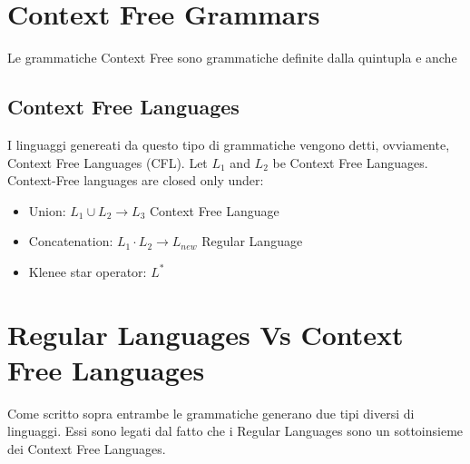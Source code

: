 \section{Context Free Grammars}
Le grammatiche Context Free sono grammatiche definite dalla quintupla \newline e anche

\subsection{Context Free Languages}
I linguaggi genereati da questo tipo di grammatiche vengono detti, ovviamente, Context Free Languages (CFL).
Let $L_1$ and $L_2$ be Context Free Languages.
Context-Free languages are closed only under:
\begin{itemize}
\item Union: $L_1 \cup L_2 \rightarrow L_3$ Context Free Language
\item Concatenation: $L_1 \cdot L_2 \rightarrow L_{new}$ Regular Language
\item Klenee star operator: $L^*$
\end{itemize}

\section{Regular Languages Vs Context Free Languages}

Come scritto sopra entrambe le grammatiche generano due tipi diversi di linguaggi. Essi sono legati dal fatto che i Regular Languages sono un sottoinsieme dei Context Free Languages.